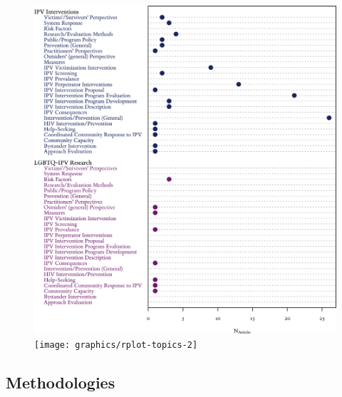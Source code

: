 \documentclass[]{tufte-handout}
\begin{document}
\begin{figure}
\includegraphics[width=\linewidth]{graphics/rplot-topics-1} \texttt{[image: graphics/rplot-topics-2]} \end{figure}

\subsection{Methodologies}\label{methodologies}
\end{document}
